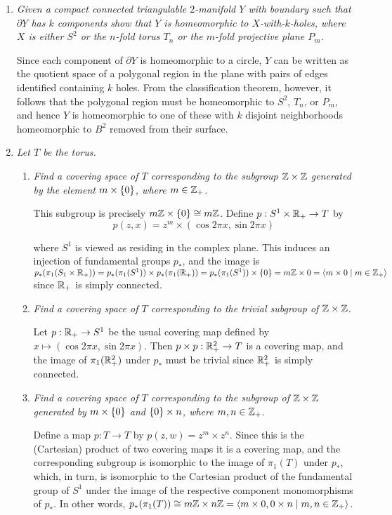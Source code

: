 \documentclass[10pt]{article}
\begin{document}
\begin{enumerate}
\item \emph{Given a compact connected triangulable $2$-manifold $Y$ with boundary such that $\partial Y$ has $k$ components show that $Y$ is homeomorphic to $X$-with-$k$-holes, where $X$ is either $S^2$ or the $n$-fold torus $T_n$ or the $m$-fold projective plane $P_m$.}

Since each component of $\partial Y$ is homeomorphic to a circle, $Y$ can be written as the quotient space of a polygonal region in the plane with pairs of edges identified containing $k$ holes.  From the classification theorem, however, it follows that the polygonal region must be homeomorphic to $S^2$, $T_n$, or $P_m$, and hence $Y$ is homeomorphic to one of these with $k$ disjoint neighborhoods homeomorphic to $B^2$ removed from their surface.

\item \emph{Let $T$ be the torus.}
\begin{enumerate}
\item \emph{Find a covering space of $T$ corresponding to the subgroup $\mathbb{Z} \times \mathbb{Z}$ generated by the element $m \times \left\{ 0 \right\}$, where $m \in \mathbb{Z}_+$.}

This subgroup is precisely $m\mathbb{Z} \times \left\{ 0 \right\} \cong m\mathbb{Z}$.  Define $p: S^1 \times \mathbb{R}_+ \rightarrow T$ by
\[
p(z, x) = z^m \times (\cos 2 \pi x, \sin 2 \pi x)
\]

where $S^1$ is viewed as residing in the complex plane.  This induces an injection of fundamental groups $p_\ast$, and the image is $p_\ast(\pi_1(S_1 \times \mathbb{R}_+)) = p_\ast(\pi_1(S^1)) \times p_\ast(\pi_1(\mathbb{R}_+)) = p_\ast(\pi_1(S^1)) \times \left\{ 0 \right\} = m \mathbb{Z} \times 0 = \left\langle m \times 0 \mid m \in \mathbb{Z}_+ \right\rangle$ since $\mathbb{R}_+$ is simply connected.

\item \emph{Find a covering space of $T$ corresponding to the trivial subgroup of $\mathbb{Z} \times \mathbb{Z}$.}

Let $p: \mathbb{R}_+ \rightarrow S^1$ be the usual covering map defined by $x \mapsto (\cos 2 \pi x, \sin 2 \pi x)$.  Then $p \times p: \mathbb{R}_+^2 \rightarrow T$ is a covering map, and the image of $\pi_1(\mathbb{R}_+^2)$ under $p_\ast$ must be trivial since $\mathbb{R}_+^2$ is simply connected.

\item \emph{Find a covering space of $T$ corresponding to the subgroup of $\mathbb{Z} \times \mathbb{Z}$ generated by $m \times \left\{ 0 \right\}$ and $\left\{ 0 \right\} \times n$, where $m,n \in \mathbb{Z}_+$.}

Define a map $p: T \rightarrow T$ by $p(z,w) = z^m \times z^n$.  Since this is the (Cartesian) product of two covering maps it is a covering map, and the corresponding subgroup is isomorphic to the image of $\pi_1(T)$ under $p_\ast$, which, in turn, is isomorphic to the Cartesian product of the fundamental group of $S^1$ under the image of the respective component monomorphisms of $p_\ast$.  In other words, $p_\ast(\pi_1(T)) \cong m\mathbb{Z} \times n\mathbb{Z} = \left\langle  m \times 0, 0 \times n \mid m,n \in \mathbb{Z}_+ \right\rangle$.


\end{enumerate}
\end{enumerate}
\end{document}
